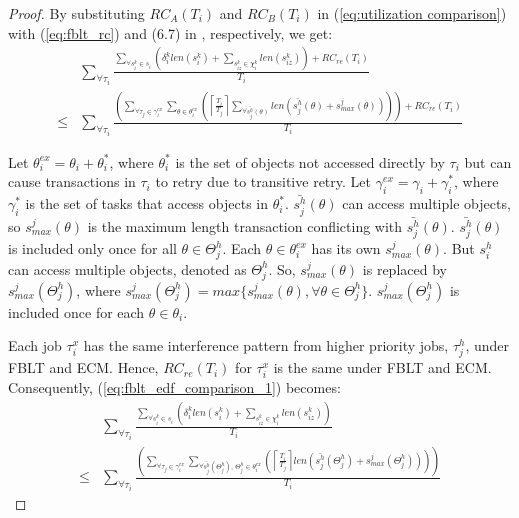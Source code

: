 \documentclass[prodmode,acmtecs]{acmsmall}
\begin{document}
\begin{compactenum}
\begin{proof}

By substituting $RC_{A}(T_{i})$ and $RC_{B}(T_{i})$ in (\ref{eq:utilization comparison})
with (\ref{eq:fblt_rc}) and (6.7) in \cite{shambake_phd_proposal}, 
respectively, we get: 
\begin{eqnarray}
 & \sum_{\forall\tau_{i}}\frac{\sum_{\forall s_{i}^{k}\in s_{i}}\left(\delta_{i}^{k}len(s_{i}^{k})+\sum_{s_{iz}^k\in \chi_i^k} len(s_{iz}^{k})\right)+RC_{re}(T_{i})}{T_{i}}\label{eq:fblt_edf_comparison_1}\\
\le & \sum_{\forall\tau_{i}}\frac{\left(\sum_{\forall\tau_{j}\in\gamma_{i}^{ex}}\sum_{\theta\in\theta_{i}^{ex}}\left(\left\lceil \frac{T_{i}}{T_{j}}\right\rceil \sum_{\forall\bar{s_{j}^{h}}(\theta)}len\left(\bar{s_{j}^{h}}(\theta)+s_{max}^{j}(\theta)\right)\right)\right)+RC_{re}(T_{i})}{T_{i}}\nonumber 
\end{eqnarray}

Let $\theta_{i}^{ex}=\theta_{i}+\theta_{i}^{*}$, where $\theta_{i}^{*}$
is the set of objects not accessed directly by $\tau_{i}$ but can
cause transactions in $\tau_{i}$ to retry due to transitive retry.
Let $\gamma_{i}^{ex}=\gamma_{i}+\gamma_{i}^{*}$, where $\gamma_{i}^{*}$
is the set of tasks that access objects in $\theta_{i}^{*}$. $\bar{s_{j}^{h}}(\theta)$
can access multiple objects, so $s_{max}^{j}(\theta)$ is the maximum
length transaction conflicting with $\bar{s_{j}^{h}}(\theta)$. $\bar{s_{j}^{h}}(\theta)$ is included only once for all $\theta \in \Theta_j^h$. Each $\theta \in \theta_i^{ex}$ has its own $s_{max}^j(\theta)$. But $s_i^h$ can access multiple objects, denoted as $\Theta_j^h$. So, $s_{max}^j(\theta)$ is replaced by $s_{max}^j(\Theta_j^h)$, where $s_{max}^j(\Theta_j^h)=max\{s_{max}^j(\theta),\forall \theta \in \Theta_j^h\}$. $s_{max}^j(\Theta_j^h)$ is included once for each $\theta \in \theta_i$. 
 
Each job $\tau_i^x$ has the same interference pattern from higher priority jobs, $\tau_j^h$, under FBLT and ECM. Hence, $RC_{re}(T_i)$ for $\tau_i^x$ is the same under FBLT and ECM. Consequently, (\ref{eq:fblt_edf_comparison_1})
becomes:
\begin{eqnarray}
 & \sum_{\forall\tau_{i}}\frac{\sum_{\forall s_{i}^{k}\in s_{i}}\left(\delta_{i}^{k}len(s_{i}^{k})+\sum_{s_{iz}^k\in \chi_i^k} len(s_{iz}^{k})\right)}{T_{i}}\label{eq:fblt_edf_comparison_3}\\
\le & \sum_{\forall\tau_{i}}\frac{\left(\sum_{\forall\tau_{j}\in\gamma_{i}^{ex}}\sum_{\forall \bar{s_{j}^{h}}(\Theta_j^h),\,\Theta_j^h\in\theta_{i}^{ex}}\left(\left\lceil \frac{T_{i}}{T_{j}}\right\rceil len\left(\bar{s_{j}^{h}}(\Theta_j^h)+s_{max}^{j}(\Theta_j^h)\right)\right)\right)}{T_{i}}\nonumber 
\end{eqnarray}



\end{proof}
\end{compactenum}
\end{document}
